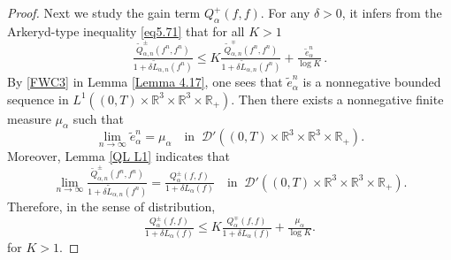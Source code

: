 \documentclass[reqno,11pt]{amsart}
\numberwithin{equation}{section}
\def\R{\mathbb{R}}
\begin{document}
\begin{proof}
Next we study the gain term $Q_\alpha^+ (f,f)$. For any $\delta>0$, it infers from the Arkeryd-type inequality \eqref{eq5.71} that for all $K > 1$
	\begin{equation}
		\tfrac{\tilde{Q}^\pm _{\alpha,n}(f^n,f^n)}{1+\delta \tilde{L}_{\alpha,n}(f^n)} \leq K \tfrac{\tilde{Q}^\mp _{\alpha,n}(f^n,f^n)}{1+\delta \tilde{L}_{\alpha,n}(f^n)} +\tfrac{\tilde{e}^n_\alpha}{\log K } \,.
	\end{equation}
By \eqref{FWC3} in Lemma \ref{Lemma 4.17}, one sees that $\tilde{e}^n_\alpha$ is a nonnegative bounded sequence in $L^1((0,T)\times \R^3 \times \R^3 \times \R_+)$. Then there exists a nonnegative finite measure $\mu_\alpha $ such that 
	\begin{equation*}
		\lim \limits_{n\rightarrow \infty} \tilde{e}^n_\alpha =\mu_\alpha \quad \text{in } \ \mathscr{D}' ((0,T)\times \R^3 \times \R^3 \times \R_+).
	\end{equation*}
Moreover, Lemma \ref{QL L1} indicates that
	\begin{equation*}
		\lim \limits_{n\rightarrow \infty} \tfrac{\tilde{Q}^\pm _{\alpha,n}(f^n,f^n)}{1+\delta \tilde{L}_{\alpha,n}(f^n)} = \tfrac{Q^\pm _{\alpha}(f,f)}{1+\delta L_{\alpha}(f)} \quad \text{in } \ \mathscr{D}'((0,T)\times \R^3 \times \R^3 \times \R_+) .
	\end{equation*}
Therefore, in the sense of distribution,
	\begin{equation}\label{KK-1}
		\tfrac{Q^\pm _{\alpha}(f,f)}{1+\delta L_{\alpha}(f)} \leq K \tfrac{Q^\mp _{\alpha}(f,f)}{1+\delta L_{\alpha}(f)} +\tfrac{\mu_\alpha}{\log K }.
	\end{equation}
for $K > 1$.


\end{proof}
\end{document}
